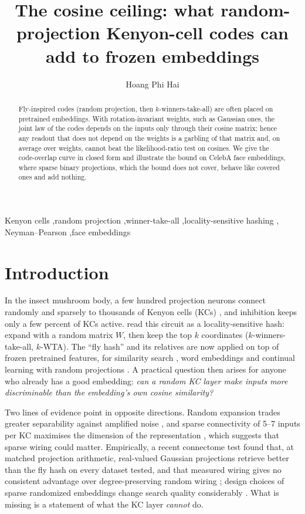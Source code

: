 \documentclass[preprint,12pt,authoryear]{elsarticle}
\theoremstyle{remark}
\begin{document}
\begin{frontmatter}
\title{The cosine ceiling: what random-projection Kenyon-cell codes can add to frozen embeddings}
\author{Hoang Phi Hai}
\address{FPT School of Business and Technology (FSB), FPT University, Ho Chi Minh City, Vietnam}

\begin{abstract}
Fly-inspired codes (random projection, then $k$-winners-take-all) are often placed on pretrained embeddings.
With rotation-invariant weights, such as Gaussian ones, the joint law of the codes depends on the inputs only
through their cosine matrix; hence any readout that does not depend on the weights is a garbling of that matrix
and, on average over weights, cannot beat the likelihood-ratio test on cosines. We give the code-overlap curve in
closed form and illustrate the bound on CelebA face embeddings, where sparse binary projections, which the bound
does not cover, behave like covered ones and add nothing.
\end{abstract}

\begin{keyword}
Kenyon cells \sep random projection \sep winner-take-all \sep locality-sensitive hashing \sep
Neyman--Pearson \sep face embeddings
\end{keyword}
\end{frontmatter}

\section{Introduction}
In the insect mushroom body, a few hundred projection neurons connect randomly and sparsely to thousands of
Kenyon cells (KCs) \citep{caron2013}, and inhibition keeps only a few percent of KCs active. \citet{dasgupta2017} read this circuit as a locality-sensitive hash: expand with a random matrix $W$,
then keep the top $k$ coordinates ($k$-winners-take-all, $k$-WTA). The ``fly hash'' and its relatives are now
applied on top of frozen pretrained features, for similarity search \citep{sharma2018,ryali2020}, word
embeddings \citep{liang2021} and continual learning with random projections \citep{mcdonnell2023}.
A practical question then arises for anyone who already has a good embedding: \emph{can a random KC layer
make inputs more discriminable than the embedding's own cosine similarity?}

Two lines of evidence point in opposite directions. Random expansion trades greater separability against
amplified noise \citep{babadi2014}, and sparse connectivity of 5--7 inputs per KC maximises the dimension of the
representation \citep{litwinkumar2017}, which suggests that sparse wiring could matter. Empirically, a recent
connectome test found that, at matched projection arithmetic, real-valued Gaussian projections retrieve better
than the fly hash on every dataset tested, and that measured wiring gives no consistent advantage over
degree-preserving random wiring \citep{senge2026}; design choices of sparse randomized embeddings change search
quality considerably \citep{kleyko2024}. What is missing is a statement of what the KC layer \emph{cannot} do.
\end{document}
